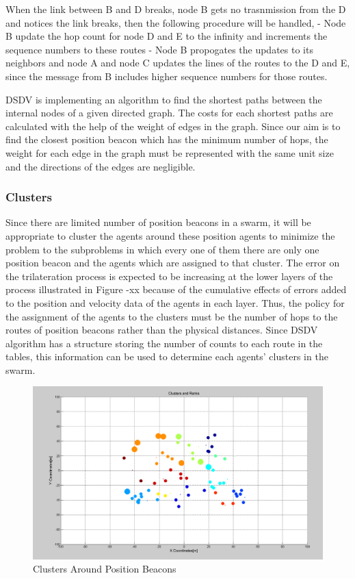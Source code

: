 \documentclass[twoside]{article}
\begin{document}
	
	When the link between B and D breaks, node B gets no trasnmission from the D and notices the link breaks, then the following procedure will be handled,
	- Node B update the hop count for node D and E to the infinity and increments the sequence numbers to these routes 
	- Node B propogates the updates to its neighbors and node A and node C updates the lines of the routes to the D and E, since the message from B includes higher sequence numbers for those routes. 
	
	DSDV is implementing an algorithm to find the shortest paths between the internal nodes of a given directed graph. The costs for each shortest paths are calculated with the help of the weight of edges in the graph. Since our aim is to find the closest position beacon which has the minimum number of hops, the weight for each edge in the graph must be represented with the same unit size and the directions of the edges are negligible. 
	\subsubsection{Clusters}
	Since there are limited number of position beacons in a swarm, it will be appropriate to cluster the agents around these position agents to minimize the problem to the subproblems in which every one of them there are only one position beacon and the agents which are assigned to that cluster. The error on the trilateration process is expected to be increasing at the lower layers of the process illustrated in Figure -xx because of the cumulative effects of errors added to the position and velocity data of the agents in each layer. Thus, the policy for the assignment of the agents to the clusters must be the number of hops to the routes of position beacons rather than the physical distances. Since DSDV algorithm has a structure storing the number of counts to each route in the tables, this information can be used to determine each agents' clusters in the swarm. 
		\begin{figure}[H]
			\caption{Clusters Around Position Beacons}
			\centering
			\includegraphics[scale = 0.35]{Clusters_Ranks_2}
		\end{figure}
\end{document}
